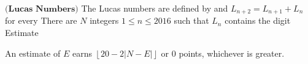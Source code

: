 $\textbf{(Lucas Numbers)}$ The Lucas numbers are defined by   and $L_{n+2} = L_{n+1} + L_n$ for every  There are $N$ integers $1 \le n \le 2016$ such that $L_n$ contains the digit  Estimate 

An estimate of $E$ earns $\left\lfloor 20 - 2|N-E| \right\rfloor$ or $0$ points, whichever is greater.